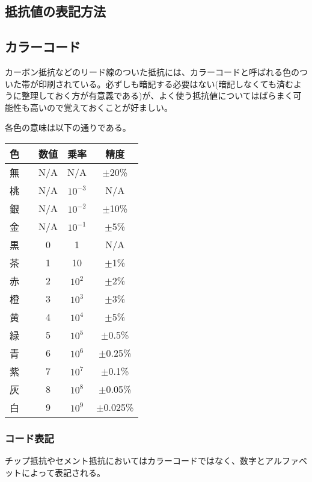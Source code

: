 \documentclass[a4paper,titlepage,here]{ujarticle}
\begin{document}
\subsection{抵抗値の表記方法}
\subsection{カラーコード}
カーボン抵抗などのリード線のついた抵抗には、カラーコードと呼ばれる色のついた帯が印刷されている。必ずしも暗記する必要はない(暗記しなくても済むように整理しておく方が有意義である)が、よく使う抵抗値についてはばらまく可能性も高いので覚えておくことが好ましい。

各色の意味は以下の通りである。

\begin{table}[H]
	\begin{tabular}{|cc|c|c|c|}\hline
		色&&数値&乗率&精度\\ \hline
		無&&N/A&N/A&$\pm$20\%\\ \hline
		桃&\cellcolor[rgb]{1,0.412,0.706}{　}&N/A&$10^{-3}$&N/A\\ \hline
		銀&\cellcolor[rgb]{0.753,0.753,0.753}{　}&N/A&$10^{-2}$&$\pm$10\%\\ \hline
		金&\cellcolor[rgb]{0.812,0.71,0.231}{　}&N/A&$10^{-1}$&$\pm$5\%\\ \hline
		黒&\cellcolor{black}{　}&0&1&N/A\\ \hline
		茶&\cellcolor[rgb]{0.647059,0.164706,0.164706}{　}&1&10&$\pm$1\%\\ \hline
		赤&\cellcolor{red}{　}&2&$10^2$&$\pm$2\%\\ \hline
		橙&\cellcolor[rgb]{0.894118,0.368627,0}{　}&3&$10^3$&$\pm$3\% \\ \hline
		黄&\cellcolor{yellow}{　}&4&$10^4$&$\pm$5\%\\ \hline
		緑&\cellcolor{green}{　}&5&$10^5$&$\pm$0.5\%\\ \hline
		青&\cellcolor{blue}{　}&6&$10^6$&$\pm$0.25\%\\ \hline
		紫&\cellcolor[rgb]{0.58,0,0.827}{　}&7&$10^7$&$\pm$0.1\%\\ \hline
		灰&\cellcolor[rgb]{0.627,0.627,0.627}{　}&8&$10^8$&$\pm$0.05\%\\ \hline
		白&\cellcolor[rgb]{1,1,1}{　}&9&$10^9$&$\pm$0.025\%\\ \hline
	\end{tabular}
\end{table}
\subsubsection{コード表記}
チップ抵抗やセメント抵抗においてはカラーコードではなく、数字とアルファベットによって表記される。
\end{document}
